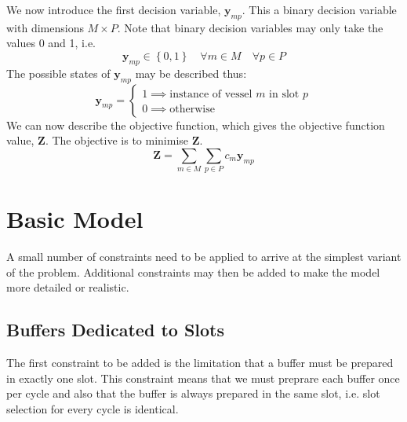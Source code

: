 We now introduce the first decision variable, $\boldsymbol{y}_{mp}$.
This a binary decision variable with dimensions $M \times P$.
Note that binary decision variables may only take the values 0 and 1, i.e.
\begin{equation}
    \boldsymbol{y}_{mp} \in \left\{ 0, 1 \right\} \quad \forall m \in M \quad
    \forall p \in P
    \label{eq.y}
\end{equation}
The possible states of $\boldsymbol{y}_{mp}$ may be described thus:
\begin{equation}
    \boldsymbol{y}_{mp} =
    \begin{cases}
        1 \implies \text{instance of vessel $m$ in slot $p$}\\
        0 \implies \text{otherwise}
    \end{cases}
\end{equation}
We can now describe the objective function, which gives the objective function
value, $\boldsymbol{Z}$.  The objective is to minimise $\boldsymbol{Z}$.
\begin{equation}
    \boldsymbol{Z} = \sum_{m \in M} \sum_{p \in P} c_m \boldsymbol{y}_{mp}
    \label{eq.objfn}
\end{equation}

\section{Basic Model}\label{S.basicprob}

A small number of constraints need to be applied to arrive at the simplest
variant of the problem.
Additional constraints may then be added to make the model more detailed or
realistic.

\subsection{Buffers Dedicated to Slots}\label{SS.constr1}

The first constraint to be added is the limitation that a buffer must be
prepared in exactly one slot.
This constraint means that we must preprare each buffer once per cycle
and also that the buffer is always prepared in the same slot, i.e. slot
selection for every cycle is identical.

